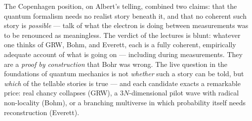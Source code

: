 \documentclass[11pt,a4paper]{article}
\theoremstyle{remark}
\begin{document}
The Copenhagen position, on Albert's telling, combined two claims: that the
quantum formalism needs no realist story beneath it, and that no coherent such
story is \emph{possible} --- talk of what the electron is doing between
measurements was to be renounced as meaningless. The verdict of the lectures is
blunt: whatever one thinks of GRW, Bohm, and Everett, each is a fully coherent,
empirically adequate account of what is going on --- including during
measurements. They are a \emph{proof by construction} that Bohr was wrong. The
live question in the foundations of quantum mechanics is not \emph{whether} such
a story can be told, but \emph{which} of the tellable stories is true --- and each
candidate exacts a remarkable price: real chancy collapses (GRW), a
$3N$-dimensional pilot wave with radical non-locality (Bohm), or a branching
multiverse in which probability itself needs reconstruction (Everett).

\end{document}
